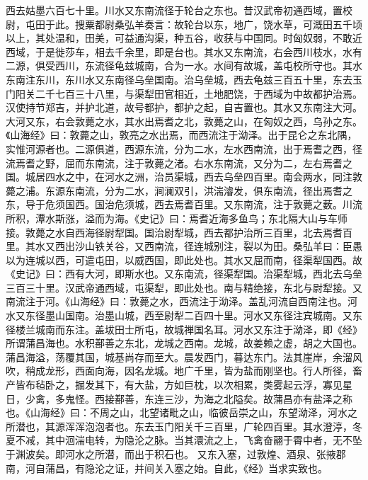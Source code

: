 \documentclass[12pt,UTF8]{ctexbook}
\begin{document}
西去姑墨六百七十里。川水又东南流径于轮台之东也。昔汉武帝初通西域，置校尉，屯田于此。搜粟都尉桑弘羊奏言：故轮台以东，地广，饶水草，可溉田五千顷以上，其处温和，田美，可益通沟渠，种五谷，收获与中国同。时匈奴弱，不敢近西域，于是徙莎车，相去千余里，即是台也。其水又东南流，右会西川枝水，水有二源，俱受西川，东流径龟兹城南，合为一水。水间有故城，盖屯校所守也。其水东南注东川，东川水又东南径乌垒国南。治乌垒城，西去龟兹三百五十里，东去玉门阳关二千七百三十八里，与渠犁田官相近，土地肥饶，于西域为中故都护治焉。汉使持节郑吉，并护北道，故号都护，都护之起，自吉置也。其水又东南注大河。大河又东，右会敦薨之水，其水出焉耆之北，敦薨之山，在匈奴之西，乌孙之东。《山海经》曰：敦薨之山，敦亮之水出焉，而西流注于泑泽。出于昆仑之东北隅，实惟河源者也。二源俱道，西源东流，分为二水，左水西南流，出于焉耆之西，径流焉耆之野，屈而东南流，注于敦薨之渚。右水东南流，又分为二，左右焉耆之国。城居四水之中，在河水之洲，治员渠城，西去乌垒四百里。南会两水，同注敦薨之浦。东源东南流，分为二水，涧澜双引，洪湍濬发，俱东南流，径出焉耆之东，导于危须国西。国治危须城，西去焉耆百里。又东南流，注于敦薨之薮。川流所积，潭水斯涨，溢而为海。《史记》曰：焉耆近海多鱼鸟；东北隔大山与车师接。敦薨之水自西海径尉犁国。国治尉犁城，西去都护治所三百里，北去焉耆百里。其水又西出沙山铁关谷，又西南流，径连城别注，裂以为田。桑弘羊曰：臣愚以为连城以西，可遣屯田，以威西国，即此处也。其水又屈而南，径渠犁国西。故《史记》曰：西有大河，即斯水也。又东南流，径渠犁国。治渠犁城，西北去乌垒三百三十里。汉武帝通西域，屯渠犁，即此处也。南与精绝接，东北与尉犁接。又南流注于河。《山海经》曰：敦薨之水，西流注于泑泽。盖乱河流自西南注也。河水又东径墨山国南。治墨山城，西至尉犁二百四十里。河水又东径注宾城南。又东径楼兰城南而东注。盖坺田士所屯，故城禅国名耳。河水又东注于泑泽，即《经》所谓蒲昌海也。水积鄯善之东北，龙城之西南。龙城，故姜赖之虚，胡之大国也。蒲昌海溢，荡覆其国，城基尚存而至大。晨发西门，暮达东门。法其崖岸，余溜风吹，稍成龙形，西面向海，因名龙城。地广千里，皆为盐而刚坚也。行人所径，畜产皆布毡卧之，掘发其下，有大盐，方如巨枕，以次相累，类雾起云浮，寡见星日，少禽，多鬼怪。西接鄯善，东连三沙，为海之北隘矣。故蒲昌亦有盐泽之称也。《山海经》曰：不周之山，北望诸毗之山，临彼岳崇之山，东望泑泽，河水之所潜也，其源浑浑泡泡者也。东去玉门阳关千三百里，广轮四百里。其水澄渟，冬夏不减，其中洄湍电转，为隐沦之脉。当其澴流之上，飞禽奋翮于霄中者，无不坠于渊波矣。即河水之所潜，而出于积石也。
又东入塞，过敦煌、酒泉、张掖郡南，河自蒲昌，有隐沦之证，并间关入塞之始。自此，《经》当求实致也。
\end{document}
